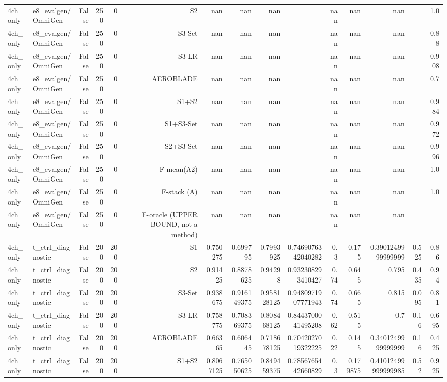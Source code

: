 \begin{table}[htbp]
\begin{tabular}{llrrrrrrrrrrrrr}
4ch\_only & e8\_evalgen/OmniGen & False & 250 & 0 & S2 & nan & nan & nan &  & nan & nan & nan &  & 1.0 \\
4ch\_only & e8\_evalgen/OmniGen & False & 250 & 0 & S3-Set & nan & nan & nan &  & nan & nan & nan &  & 0.88 \\
4ch\_only & e8\_evalgen/OmniGen & False & 250 & 0 & S3-LR & nan & nan & nan &  & nan & nan & nan &  & 0.908 \\
4ch\_only & e8\_evalgen/OmniGen & False & 250 & 0 & AEROBLADE & nan & nan & nan &  & nan & nan & nan &  & 0.7 \\
4ch\_only & e8\_evalgen/OmniGen & False & 250 & 0 & S1+S2 & nan & nan & nan &  & nan & nan & nan &  & 0.984 \\
4ch\_only & e8\_evalgen/OmniGen & False & 250 & 0 & S1+S3-Set & nan & nan & nan &  & nan & nan & nan &  & 0.972 \\
4ch\_only & e8\_evalgen/OmniGen & False & 250 & 0 & S2+S3-Set & nan & nan & nan &  & nan & nan & nan &  & 0.996 \\
4ch\_only & e8\_evalgen/OmniGen & False & 250 & 0 & F-mean(A2) & nan & nan & nan &  & nan & nan & nan &  & 1.0 \\
4ch\_only & e8\_evalgen/OmniGen & False & 250 & 0 & F-stack (A) & nan & nan & nan &  & nan & nan & nan &  & 1.0 \\
4ch\_only & e8\_evalgen/OmniGen & False & 250 & 0 & F-oracle (UPPER BOUND, not a method) & nan & nan & nan &  & nan & nan & nan &  &  \\
4ch\_only & t\_ctrl\_diagnostic & False & 200 & 200 & S1 & 0.750275 & 0.699795 & 0.7993925 & 0.7469076342040282 & 0.3 & 0.175 & 0.3901249999999999 & 0.525 & 0.86 \\
4ch\_only & t\_ctrl\_diagnostic & False & 200 & 200 & S2 & 0.91425 & 0.8878625 & 0.94298 & 0.932308293410427 & 0.74 & 0.645 & 0.795 & 0.435 & 0.94 \\
4ch\_only & t\_ctrl\_diagnostic & False & 200 & 200 & S3-Set & 0.938675 & 0.916149375 & 0.958128125 & 0.9480971907771943 & 0.74 & 0.665 & 0.815 & 0.095 & 0.81 \\
4ch\_only & t\_ctrl\_diagnostic & False & 200 & 200 & S3-LR & 0.758775 & 0.708369375 & 0.808468125 & 0.8443700041495208 & 0.62 & 0.515 & 0.7 & 0.16 & 0.695 \\
4ch\_only & t\_ctrl\_diagnostic & False & 200 & 200 & AEROBLADE & 0.66365 & 0.606445 & 0.718678125 & 0.7042027019322225 & 0.22 & 0.145 & 0.3401249999999999 & 0.16 & 0.425 \\
4ch\_only & t\_ctrl\_diagnostic & False & 200 & 200 & S1+S2 & 0.8067125 & 0.765050625 & 0.849459375 & 0.7856765442660829 & 0.3 & 0.179875 & 0.41012499999999985 & 0.52 & 0.925 \\

\end{tabular}
\end{table}
